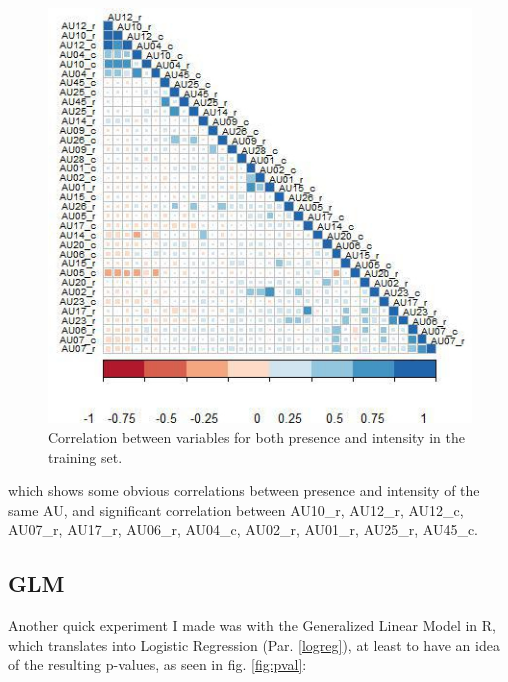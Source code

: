 \begin{figure}[H]
	\centering
	\includegraphics[width=1\textwidth]{images/correlation_matrix}
	\caption{Correlation between variables for both presence and intensity in the training set.}
	\label{fig:correlation_matrix}
\end{figure}

which shows some obvious correlations between presence and intensity of the same AU, and significant correlation between AU10\_r, AU12\_r, AU12\_c, AU07\_r, AU17\_r, AU06\_r, AU04\_c, AU02\_r, AU01\_r, AU25\_r, AU45\_c.

\clearpage

\subsection{GLM} \label{GLM}
Another quick experiment I made was with the Generalized Linear Model in R, which translates into Logistic Regression (Par. \ref{logreg}), at least to have an idea of the resulting p-values, as seen in fig. \ref{fig:pval}:

